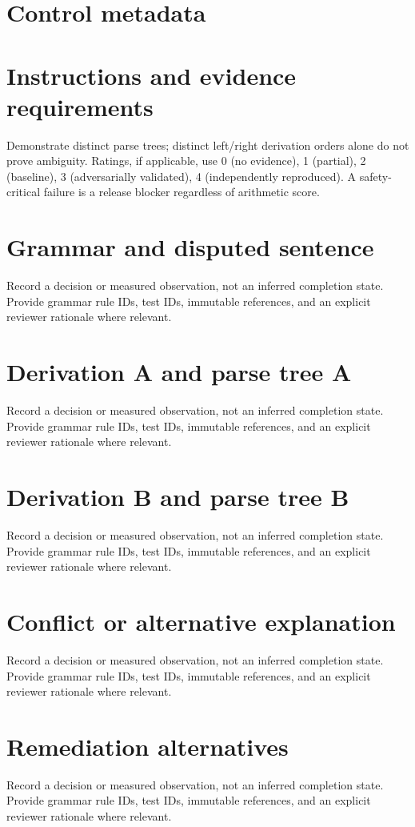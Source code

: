 \documentclass[11pt,letterpaper]{article}
\begin{document}
\makedoctitle\makedocsummary
\tableofcontents\clearpage
\section{Control metadata}
\section{Instructions and evidence requirements}
Demonstrate distinct parse trees; distinct left/right derivation orders alone do not prove ambiguity. Ratings, if applicable, use 0 (no evidence), 1 (partial), 2 (baseline), 3 (adversarially validated), 4 (independently reproduced). A safety-critical failure is a release blocker regardless of arithmetic score.
\section{Grammar and disputed sentence}
Record a decision or measured observation, not an inferred completion state. Provide grammar rule IDs, test IDs, immutable references, and an explicit reviewer rationale where relevant.
\section{Derivation A and parse tree A}
Record a decision or measured observation, not an inferred completion state. Provide grammar rule IDs, test IDs, immutable references, and an explicit reviewer rationale where relevant.
\section{Derivation B and parse tree B}
Record a decision or measured observation, not an inferred completion state. Provide grammar rule IDs, test IDs, immutable references, and an explicit reviewer rationale where relevant.
\section{Conflict or alternative explanation}
Record a decision or measured observation, not an inferred completion state. Provide grammar rule IDs, test IDs, immutable references, and an explicit reviewer rationale where relevant.
\section{Remediation alternatives}
Record a decision or measured observation, not an inferred completion state. Provide grammar rule IDs, test IDs, immutable references, and an explicit reviewer rationale where relevant.
\end{document}
